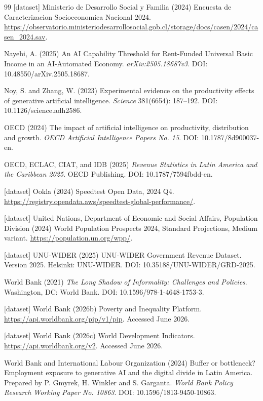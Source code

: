 \documentclass[11pt,a4paper]{article}
\begin{document}
\begin{thebibliography}{99}
[dataset] Ministerio de Desarrollo Social y Familia (2024)
\newblock Encuesta de Caracterizacion Socioeconomica Nacional 2024.
\newblock \url{https://observatorio.ministeriodesarrollosocial.gob.cl/storage/docs/casen/2024/casen_2024.sav}.

Nayebi, A. (2025)
\newblock An AI Capability Threshold for Rent-Funded Universal Basic Income in an AI-Automated Economy.
\newblock \emph{arXiv:2505.18687v3}. DOI: 10.48550/arXiv.2505.18687.

Noy, S. and Zhang, W. (2023)
\newblock Experimental evidence on the productivity effects of generative artificial intelligence.
\newblock \emph{Science} 381(6654): 187--192. DOI: 10.1126/science.adh2586.

OECD (2024)
\newblock The impact of artificial intelligence on productivity, distribution and growth.
\newblock \emph{OECD Artificial Intelligence Papers No. 15}. DOI: 10.1787/8d900037-en.

OECD, ECLAC, CIAT, and IDB (2025)
\newblock \emph{Revenue Statistics in Latin America and the Caribbean 2025}.
\newblock OECD Publishing. DOI: 10.1787/7594fbdd-en.

[dataset] Ookla (2024)
\newblock Speedtest Open Data, 2024 Q4.
\newblock \url{https://registry.opendata.aws/speedtest-global-performance/}.

[dataset] United Nations, Department of Economic and Social Affairs, Population Division (2024)
\newblock World Population Prospects 2024, Standard Projections, Medium variant.
\newblock \url{https://population.un.org/wpp/}.

[dataset] UNU-WIDER (2025)
\newblock UNU-WIDER Government Revenue Dataset. Version 2025.
\newblock Helsinki: UNU-WIDER. DOI: 10.35188/UNU-WIDER/GRD-2025.

World Bank (2021)
\newblock \emph{The Long Shadow of Informality: Challenges and Policies}.
\newblock Washington, DC: World Bank. DOI: 10.1596/978-1-4648-1753-3.

[dataset] World Bank (2026b)
\newblock Poverty and Inequality Platform.
\newblock \url{https://api.worldbank.org/pip/v1/pip}. Accessed June 2026.

[dataset] World Bank (2026c)
\newblock World Development Indicators.
\newblock \url{https://api.worldbank.org/v2}. Accessed June 2026.

World Bank and International Labour Organization (2024)
\newblock Buffer or bottleneck? Employment exposure to generative AI and the digital divide in Latin America. Prepared by P. Gmyrek, H. Winkler and S. Garganta.
\newblock \emph{World Bank Policy Research Working Paper No. 10863}. DOI: 10.1596/1813-9450-10863.

\end{thebibliography}
\end{document}
